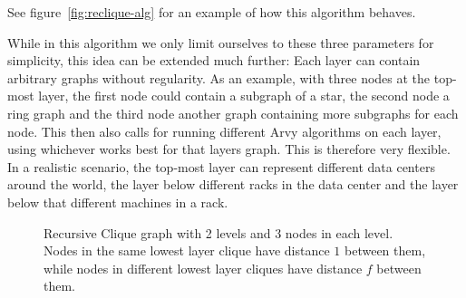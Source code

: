 \documentclass[a4paper, oneside]{discothesis}
\begin{document}
See figure~\ref{fig:reclique-alg} for an example of how this algorithm behaves.

While in this algorithm we only limit ourselves to these three parameters for simplicity, this idea can be extended much further: Each layer can contain arbitrary graphs without regularity. As an example, with three nodes at the top-most layer, the first node could contain a subgraph of a star, the second node a ring graph and the third node another graph containing more subgraphs for each node. This then also calls for running different Arvy algorithms on each layer, using whichever works best for that layers graph. This is therefore very flexible. In a realistic scenario, the top-most layer can represent different data centers around the world, the layer below different racks in the data center and the layer below that different machines in a rack.

\begin{figure}
\centering
{}
\caption{Recursive Clique graph with 2 levels and 3 nodes in each level. Nodes in the same lowest layer clique have distance $1$ between them, while nodes in different lowest layer cliques have distance $f$ between them.}
\label{fig:reclique}
\end{figure}
\end{document}
